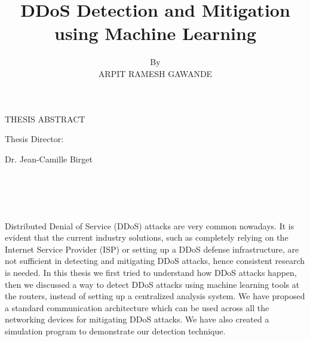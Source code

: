 \documentclass[12pt,oneside,a4paper]{article}
\title{\normalsize DDoS Detection and Mitigation using Machine Learning}
\author{\normalsize By \\ \normalsize ARPIT RAMESH GAWANDE}
\date{}
\begin{document}
\renewcommand{\thepage}{\roman{page}}%
\setcounter{page}{2}%
\makeatletter
{\centering \normalsize THESIS ABSTRACT \par
\vspace{3mm}
\large\@title \par
\vspace{3mm}
\@author \par
\vspace{3mm}
Thesis Director: \par
Dr. Jean-Camille Birget \par}
\\~\\~\\~\\ %
Distributed Denial of Service (DDoS) attacks are very common nowadays. It is evident that the current industry solutions, such as completely relying on the Internet Service Provider (ISP) or setting up a DDoS defense infrastructure, are not sufficient in detecting and mitigating DDoS attacks, hence consistent research is needed. In this thesis we first tried to understand how DDoS attacks happen, then we discussed a way to detect DDoS attacks using machine learning tools at the routers, instead of setting up a centralized analysis system. We have proposed a standard communication architecture which can be used across all the networking devices for mitigating DDoS attacks. We have also created a simulation program to demonstrate our detection technique.
\end{document}
